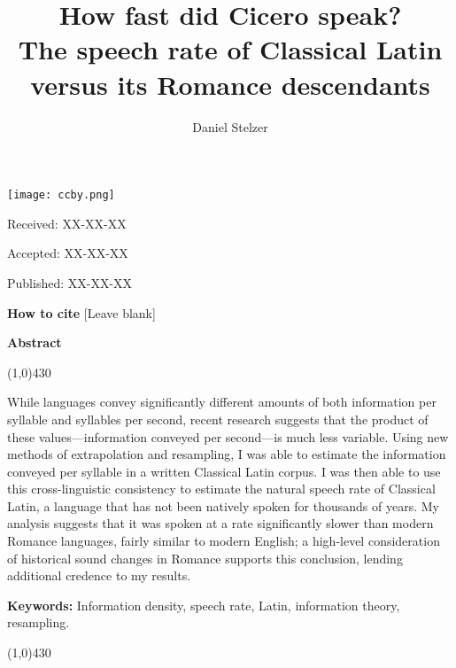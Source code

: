 \documentclass[12pt,twoside,leqno]{article} %
\title{{\Huge{}How fast did Cicero speak?}\\{\Large{}The speech rate of Classical Latin versus its Romance descendants}}
\author{Daniel Stelzer}
\affil{University of Illinois at Urbana-Champaign\\stelzer3@illinois.edu}
\date{}
\makeatletter
\def\maketitle{{%
		\renewenvironment{tabular}[2][]
		{\begin{flushleft}}
			{\end{flushleft}}
		\AB@maketitle}}
\makeatother
\begin{document}
\maketitle

\thispagestyle{first}

\vspace{0.5cm}
\noindent \texttt{[image: ccby.png]}

\hfill Received: XX-XX-XX

\hfill Accepted: XX-XX-XX

\hfill Published: XX-XX-XX

\vspace{1cm}

\noindent \textbf{How to cite} [Leave blank]

\vspace{1.5cm}

\noindent \textbf{Abstract}
\begin{center}
 	\line(1,0){430}
\end{center}
\vspace{-0,3cm}
\noindent While languages convey significantly different amounts of both information per syllable and syllables per second, recent research suggests that the product of these values---information conveyed per second---is much less variable. Using new methods of extrapolation and resampling, I was able to estimate the information conveyed per syllable in a written Classical Latin corpus. I was then able to use this cross-linguistic consistency to estimate the natural speech rate of Classical Latin, a language that has not been natively spoken for thousands of years. My analysis suggests that it was spoken at a rate significantly slower than modern Romance languages, fairly similar to modern English; a high-level consideration of historical sound changes in Romance supports this conclusion, lending additional credence to my results.

\vspace{5mm}

\noindent \textbf{Keywords:} Information density, speech rate, Latin, information theory, resampling.

\vspace{4mm}
\begin{center}
	\line(1,0){430}
\end{center}

\end{document}
